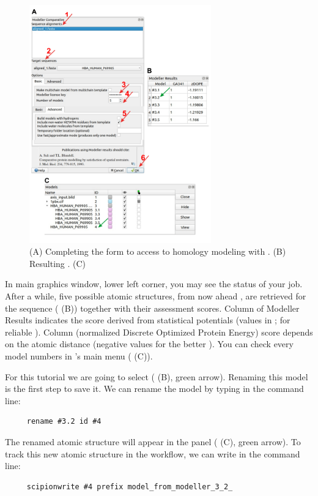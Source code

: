   \begin{figure}[H]
  \centering 
  \captionsetup{width=.7\linewidth} 
  \includegraphics[width=0.7\textwidth]{Images/Fig15}
  \caption{(A) Completing the form to access to homology modeling with \modeller. (B) Resulting . (C) \chimera {}}
  \label{fig:modeller}
  \end{figure}

In \chimera main graphics window, lower left corner, you may see the status of your job. After a while, five possible atomic structures, from now ahead , are retrieved for the  sequence ( (B)) together with their assessment scores. Column  of Modeller Results indicates the score derived from statistical potentials (values in \ttt{[0,1]};  for reliable ). Column  (normalized Discrete Optimized Protein Energy) score depends on the atomic distance (negative values for the better ). You can check every model numbers in \chimera's main menu ( (C)).

For this tutorial we are going to select    ( (B), green arrow). Renaming this model is the first step to save it. We can rename the model by typing in the \chimera command line:
 \begin{verbatim}
     rename #3.2 id #4
 \end{verbatim}
The renamed atomic structure will appear in the  panel ( (C), green arrow). To track this new atomic structure in the \scipion workflow, we can write in the \chimera command line:
\begin{verbatim}
     scipionwrite #4 prefix model_from_modeller_3_2_
 \end{verbatim}
 
